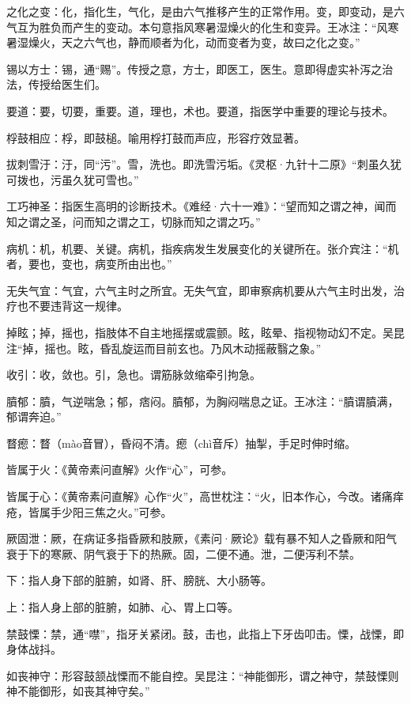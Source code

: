 \documentclass[draft,12pt]{ctexbook}
\begin{document}
\begin{jiaozhu}
  \item 之化之变：化，指化生，气化，是由六气推移产生的正常作用。变，即变动，是六气互为胜负而产生的变动。本句意指风寒暑湿燥火的化生和变异。王冰注：“风寒暑湿燥火，天之六气也，静而顺者为化，动而变者为变，故曰之化之变。”
  \item 锡以方士：锡，通“赐”。传授之意，方士，即医工，医生。意即得虚实补泻之治法，传授给医生们。
  \item 要道：要，切要，重要。道，理也，术也。要道，指医学中重要的理论与技术。
  \item 桴鼓相应：桴，即鼓槌。喻用桴打鼓而声应，形容疗效显著。
  \item 拔刺雪汙：汙，同“污”。雪，洗也。即洗雪污垢。《灵枢·九针十二原》“刺虽久犹可拨也，污虽久犹可雪也。”
  \item 工巧神圣：指医生高明的诊断技术。《难经·六十一难》：“望而知之谓之神，闻而知之谓之圣，问而知之谓之工，切脉而知之谓之巧。”
  \item 病机：机，机要、关键。病机，指疾病发生发展变化的关键所在。张介宾注：“机者，要也，变也，病变所由出也。”
  \item 无失气宜：气宜，六气主时之所宜。无失气宜，即审察病机要从六气主时出发，治疗也不要违背这一规律。
  \item 掉眩；掉，摇也，指肢体不自主地摇摆或震颤。眩，眩晕、指视物动幻不定。吴昆注“掉，摇也。眩，昏乱旋运而目前玄也。乃风木动摇蔽翳之象。”
  \item 收引：收，敛也。引，急也。谓筋脉敛缩牵引拘急。
  \item 膹郁：膹，气逆喘急；郁，痞闷。膹郁，为胸闷喘息之证。王冰注：“膹谓膹满，郁谓奔迫。”
  \item 瞀瘛：瞀（mào音冒），昏闷不清。瘛（chì音斥）抽掣，手足时伸时缩。
  \item 皆属于火：《黄帝素问直解》火作“心”，可参。
  \item 皆属于心：《黄帝素问直解》心作“火”，高世枕注：“火，旧本作心，今改。诸痛痒疮，皆属手少阳三焦之火。”可参。
  \item 厥固泄：厥，在病证多指昏厥和肢厥，《素问·厥论》载有暴不知人之昏厥和阳气衰于下的寒厥、阴气衰于下的热厥。固，二便不通。泄，二便泻利不禁。
  \item 下：指人身下部的脏腑，如肾、肝、膀胱、大小肠等。
  \item 上：指人身上部的脏腑，如肺、心、胃上口等。
  \item 禁鼓慄：禁，通“噤”，指牙关紧闭。鼓，击也，此指上下牙齿叩击。慄，战慄，即身体战抖。
  \item 如丧神守：形容鼓颔战慄而不能自控。吴昆注：“神能御形，谓之神守，禁鼓慄则神不能御形，如丧其神守矣。”

\end{jiaozhu}
\end{document}
